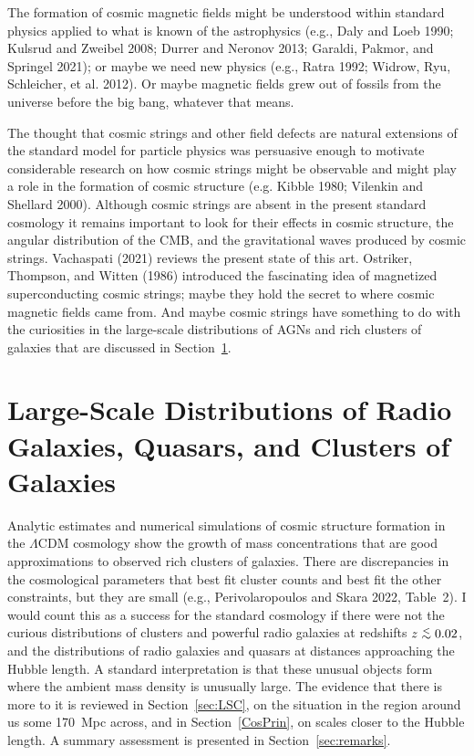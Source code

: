 \documentclass[fleqn,usenatbib]{mnras}
\def\lap{\lower.5ex\hbox{$\; \buildrel < \over \sim \;$}}
\begin{document}
The formation of cosmic magnetic fields might be understood within standard physics applied to what is known of the astrophysics (e.g., Daly and Loeb 1990; Kulsrud and Zweibel 2008; Durrer and  Neronov 2013; Garaldi, Pakmor, and Springel 2021); or maybe we need new physics (e.g., Ratra 1992; Widrow, Ryu, Schleicher, et al. 2012). Or maybe magnetic fields grew out of fossils from the universe before the big bang, whatever that means.

The thought that cosmic strings and other field defects are natural extensions of the standard model for particle physics was persuasive enough to motivate considerable research on how cosmic strings might be observable and might play a role in the formation of cosmic structure (e.g. Kibble 1980; Vilenkin and Shellard 2000). Although  cosmic strings are absent in the present standard cosmology it remains important to look for their effects in cosmic structure, the angular distribution of the CMB, and the gravitational waves produced by cosmic strings. Vachaspati (2021) reviews the present state of this art. Ostriker, Thompson, and Witten (1986) introduced the fascinating idea of magnetized superconducting cosmic strings; maybe they hold the secret to where cosmic magnetic fields came from.  And maybe cosmic strings have something to do with the curiosities in the large-scale distributions of AGNs and rich clusters of galaxies that are discussed in Section~\ref{sec:distributions}. 

\section{Large-Scale Distributions of Radio Galaxies, Quasars, and Clusters of Galaxies}\label{sec:distributions}

Analytic estimates and numerical simulations of cosmic structure formation in the $\Lambda$CDM cosmology show the growth of mass concentrations that are good approximations to observed rich clusters of galaxies. There are discrepancies in the cosmological parameters that best fit cluster counts and best fit the other constraints, but they are small (e.g., Perivolaropoulos and Skara 2022, Table~2). I would count this as a success for the standard cosmology if there were not the curious distributions of clusters and powerful radio galaxies at redshifts $z\lap 0.02$, and the distributions of radio galaxies and quasars at distances approaching the Hubble length. A standard interpretation is that these unusual objects form where the ambient mass density is unusually large. The evidence that there is more to it is reviewed in Section~\ref{sec:LSC}, on the situation in the region around us some 170~Mpc across, and in Section~\ref{CosPrin}, on scales closer to the Hubble length. A summary assessment is presented in Section~\ref{sec:remarks}. 
\end{document}
